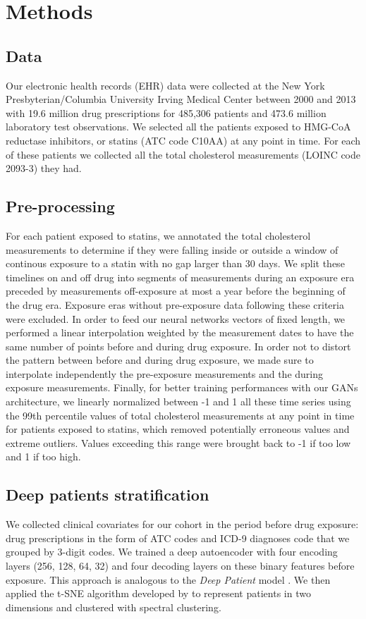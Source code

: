 \documentclass{article}
\begin{document}
\section{Methods}
\subsection{Data}
Our electronic health records (EHR) data were collected at the New York Presbyterian/Columbia University Irving Medical Center between 2000 and 2013 with 19.6 million drug prescriptions for 485,306 patients and 473.6 million laboratory test observations. We selected all the patients exposed to HMG-CoA reductase inhibitors, or statins (ATC code C10AA) at any point in time. For each of these patients we collected all the total cholesterol measurements (LOINC code 2093-3) they had.

\subsection{Pre-processing}
For each patient exposed to statins, we annotated the total cholesterol measurements to determine if they were falling inside or outside a window of continous exposure to a statin with no gap larger than 30 days. We split these timelines on and off drug into segments of measurements during an exposure era preceded by measurements off-exposure at most a year before the beginning of the drug era. Exposure eras without pre-exposure data following these criteria were excluded. In order to feed our neural networks vectors of fixed length, we performed a linear interpolation weighted by the measurement dates to have the same number of points before and during drug exposure. In order not to distort the pattern between before and during drug exposure, we made sure to interpolate independently the pre-exposure measurements and the during exposure measurements. Finally, for better training performances with our GANs architecture, we linearly normalized between -1 and 1 all these time series using the 99th percentile values of total cholesterol measurements at any point in time for patients exposed to statins, which removed potentially erroneous values and extreme outliers. Values exceeding this range were brought back to -1 if too low and 1 if too high.

\subsection{Deep patients stratification}
We collected clinical covariates for our cohort in the period before drug exposure: drug prescriptions in the form of ATC codes and ICD-9 diagnoses code that we grouped by 3-digit codes. We trained a deep autoencoder with four encoding layers (256, 128, 64, 32) and four decoding layers on these binary features before exposure. This approach is analogous to the \textit{Deep Patient} model \cite{miotto2016deep}. We then applied the t-SNE algorithm developed by \citet{maaten2008visualizing} to represent patients in two dimensions and clustered with spectral clustering.
\end{document}
